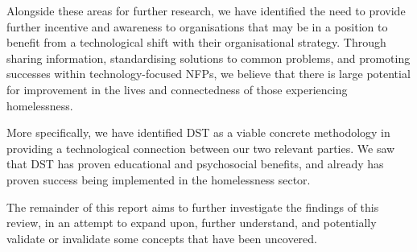 Alongside these areas for further research, we have identified the need to provide further incentive and awareness to organisations that may be in a position to benefit from a technological shift with their organisational strategy. Through sharing information, standardising solutions to common problems, and promoting successes within technology-focused NFPs, we believe that there is large potential for improvement in the lives and connectedness of those experiencing homelessness.

More specifically, we have identified DST as a viable concrete methodology in providing a technological connection between our two relevant parties. We saw that DST has proven educational and psychosocial benefits, and already has proven success being implemented in the homelessness sector.

The remainder of this report aims to further investigate the findings of this review, in an attempt to expand upon, further understand, and potentially validate or invalidate some concepts that have been uncovered.
